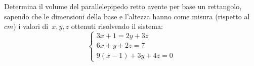\begin{esercizio}
 \label{ese:22.63}
Determina il volume del parallelepipedo retto avente
per base un rettangolo, sapendo che le dimensioni della base e
l'altezza hanno come misura (rispetto al~\(\unit{cm}\)) i valori
di~\(x, y, z\) ottenuti risolvendo il sistema:
\[\left\{\begin{array}{l}3x+1=2y+3z \\6x+y+2z=7
\\9(x-1)+3y+4z=0 \end{array}\right.\]
\end{esercizio}


% 
% 
% 

